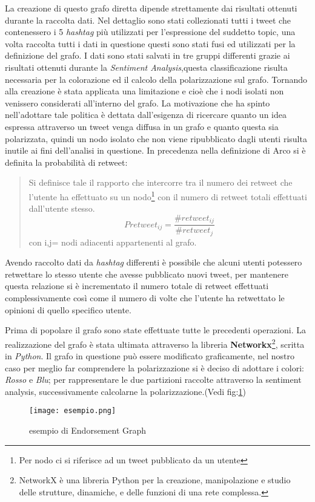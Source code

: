 La creazione di questo grafo diretta dipende strettamente dai risultati ottenuti durante la raccolta dati. Nel dettaglio sono stati collezionati tutti i tweet che contenessero i 5 \textit{hashtag} più utilizzati per l'espressione del suddetto topic, una volta raccolta tutti i dati in questione questi sono stati fusi ed utilizzati per la definizione del grafo. I dati sono stati salvati in tre gruppi differenti grazie ai risultati ottenuti durante la \textit{Sentiment Analysis},questa classificazione risulta necessaria per la colorazione ed il calcolo della polarizzazione sul grafo. Tornando alla creazione è stata applicata una limitazione e cioè che i nodi isolati non venissero considerati all'interno del grafo. La motivazione che ha spinto nell'adottare tale politica è dettata dall'esigenza di ricercare quanto un idea espressa attraverso un tweet venga diffusa in un grafo e quanto questa sia polarizzata, quindi un nodo isolato che non viene ripubblicato dagli utenti risulta inutile ai fini dell'analisi in questione.
In precedenza nella definizione di Arco si è definita la probabilità di retweet:
\begin{quote}
Si definisce tale il rapporto che intercorre tra il numero dei retweet che l'utente ha effettuato su un nodo\footnote{Per nodo ci si riferisce ad un tweet pubblicato da un utente} con il numero di retweet totali effettuati dall'utente stesso.
\begin{equation}
 Pretweet_{ij} = \dfrac{\#retweet_{ij}}{\#retweet_{j}} 
\end{equation}
 con i,j= nodi adiacenti appartenenti al grafo.
 \end{quote}
 Avendo raccolto dati da \textit{hashtag} differenti è possibile che alcuni utenti potessero retwettare lo stesso utente che avesse pubblicato nuovi tweet, per mantenere questa relazione si è incrementato il numero totale di retweet effettuati complessivamente così come il numero di volte che l'utente ha retwettato le opinioni di quello specifico utente. 

Prima di popolare il grafo sono state effettuate tutte le precedenti operazioni. La realizzazione del grafo è stata ultimata attraverso la libreria \textbf{Networkx}\footnote{NetworkX è una libreria Python per la creazione, manipolazione e studio delle strutture, dinamiche, e delle funzioni di una rete complessa.}, scritta in \textit{Python}.
Il grafo in questione può essere modificato graficamente, nel nostro caso per meglio far comprendere la polarizzazione si è deciso di adottare i colori: 	\textit{Rosso} e \textit{Blu}; per rappresentare le due partizioni raccolte attraverso la sentiment analysis, successivamente calcolarne la polarizzazione.(Vedi fig:\ref{endorsement})
\begin{figure}[!h]
    \begin{center}
      \texttt{[image: esempio.png]}
		\caption{esempio di Endorsement Graph}
	\label{endorsement}
    \end{center}
  \end{figure}
\newpage
